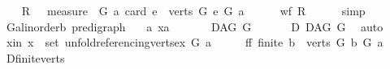 \begin{isabellebody}
\isamarkupfalse%
\isanewline
%
\isadelimproof
%
\endisadelimproof
%
\isatagproof
{}\isamarkupfalse%
\isanewline
\ \ \isamarkupfalse%
\ {\isacharquery}{\kern0pt}R\ {\isacharequal}{\kern0pt}\ {\isachardoublequoteopen}\ measure\ {\isacharparenleft}{\kern0pt}\ {\isasymlambda}{\isacharparenleft}{\kern0pt}G{\isacharcomma}{\kern0pt}\ a{\isacharparenright}{\kern0pt}{\isachardot}{\kern0pt}\ card\ {\isacharbraceleft}{\kern0pt}e\ {\isasymin}\ verts\ G{\isachardot}{\kern0pt}\ e\ {\isasymrightarrow}\isactrlsup {\isacharplus}{\kern0pt}\isactrlbsub G\isactrlesub \ a{\isacharbraceright}{\kern0pt}{\isacharparenright}{\kern0pt}{\isachardoublequoteclose}\ \ \isanewline
\ \ \isamarkupfalse%
\ {\isachardoublequoteopen}wf\ {\isacharquery}{\kern0pt}R{\isachardoublequoteclose}\isanewline
\ \ \ \ \isamarkupfalse%
\ simp\ \isanewline
{}\isamarkupfalse%
\isanewline
\ \ \isamarkupfalse%
\ G{\isacharcolon}{\kern0pt}{\isacharcolon}{\kern0pt}{\isachardoublequoteopen}{\isacharparenleft}{\kern0pt}{\isacharprime}{\kern0pt}a{\isacharcolon}{\kern0pt}{\isacharcolon}{\kern0pt}linorder{\isacharcomma}{\kern0pt}{\isacharprime}{\kern0pt}b{\isacharparenright}{\kern0pt}\ pre{\isacharunderscore}{\kern0pt}digraph{\isachardoublequoteclose}\isanewline
\ \ \ a\ x{\isacharcolon}{\kern0pt}{\isacharcolon}{\kern0pt}{\isacharprime}{\kern0pt}a\ \isanewline
\ \ \isamarkupfalse%
\ {\isachardoublequoteopen}{\isasymnot}\ {\isasymnot}\ DAG\ G{\isachardoublequoteclose}\ \isanewline
\ \ \isamarkupfalse%
\ \isamarkupfalse%
\ D{\isacharcolon}{\kern0pt}\ DAG\ G\ \isamarkupfalse%
\ auto\isanewline
\ \ \isamarkupfalse%
\ x{\isacharunderscore}{\kern0pt}in{\isacharcolon}{\kern0pt}\ {\isachardoublequoteopen}x\ {\isasymin}\ set\ {\isacharparenleft}{\kern0pt}unfold{\isacharunderscore}{\kern0pt}referencing{\isacharunderscore}{\kern0pt}verts{\isacharunderscore}{\kern0pt}ex\ G\ a{\isacharparenright}{\kern0pt}{\isachardoublequoteclose}\isanewline
\ \ \isamarkupfalse%
\ \isamarkupfalse%
\ ff{\isacharcolon}{\kern0pt}\ {\isachardoublequoteopen}finite\ {\isacharbraceleft}{\kern0pt}b\ {\isasymin}\ verts\ G{\isachardot}{\kern0pt}\ b\ {\isasymrightarrow}\isactrlbsub G\isactrlesub \ a{\isacharbraceright}{\kern0pt}{\isachardoublequoteclose}\ \isamarkupfalse%
\ D{\isachardot}{\kern0pt}finite{\isacharunderscore}{\kern0pt}verts\isanewline
\ \ \ \ \isamarkupfalse%

\end{isabellebody}
